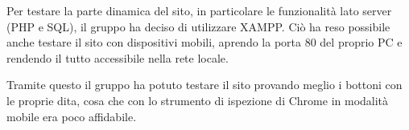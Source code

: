 Per testare la parte dinamica del sito, in particolare le funzionalità lato server (PHP e SQL), il gruppo ha deciso di utilizzare XAMPP. Ciò ha reso possibile
anche testare il sito con dispositivi mobili, aprendo la porta 80 del proprio PC e rendendo il tutto accessibile nella rete locale.

Tramite questo il gruppo ha potuto testare il sito provando meglio i bottoni con le proprie dita, cosa che con lo strumento di ispezione di Chrome in modalità mobile era poco affidabile.